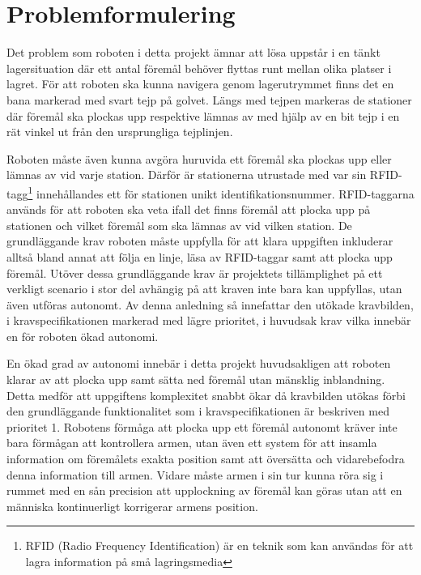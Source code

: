 

\section{Problemformulering}

Det problem som roboten i detta projekt ämnar att lösa uppstår i en tänkt lagersituation där ett antal föremål behöver flyttas runt mellan olika platser i lagret. För att roboten ska kunna navigera genom lagerutrymmet finns det en bana markerad med svart tejp på golvet. Längs med tejpen markeras de stationer där föremål ska plockas upp respektive lämnas av med hjälp av en bit tejp i en rät vinkel ut från den ursprungliga tejplinjen.


Roboten måste även kunna avgöra huruvida ett föremål ska plockas upp eller lämnas av vid varje station. Därför är stationerna utrustade med var sin RFID-tagg\footnote{RFID (Radio Frequency Identification) är en teknik som kan användas för att lagra information på små lagringsmedia} innehållandes ett för stationen unikt identifikationsnummer. RFID-taggarna används för att roboten ska veta ifall det finns föremål att plocka upp på stationen och vilket föremål som ska lämnas av vid vilken station.
De grundläggande krav roboten måste uppfylla för att klara uppgiften inkluderar alltså bland annat att följa en linje, läsa av RFID-taggar samt att plocka upp föremål. Utöver dessa grundläggande krav är projektets tillämplighet på ett verkligt scenario i stor del avhängig på att kraven inte bara kan uppfyllas, utan även utföras autonomt. Av denna anledning så innefattar den utökade kravbilden, i kravspecifikationen markerad med lägre prioritet, i huvudsak krav vilka innebär en för roboten ökad autonomi.

En ökad grad av autonomi innebär i detta projekt huvudsakligen att roboten klarar av att plocka upp samt sätta ned föremål utan mänsklig inblandning. Detta medför att uppgiftens komplexitet snabbt ökar då kravbilden utökas förbi den grundläggande funktionalitet som i kravspecifikationen är beskriven med prioritet 1. Robotens förmåga att plocka upp ett föremål autonomt kräver inte bara förmågan att kontrollera armen, utan även ett system för att insamla information om föremålets exakta position samt att översätta och vidarebefodra denna information till armen. Vidare måste armen i sin tur kunna röra sig i rummet med en sån precision att upplockning av föremål kan göras utan att en människa kontinuerligt korrigerar armens position.
